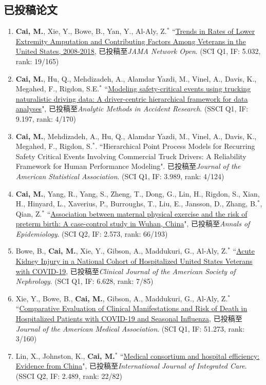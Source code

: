 \documentclass[11pt, a4paper]{article}
\begin{document}
	\subsection*{已投稿论文}
	\begin{enumerate}[leftmargin=0ex,itemsep=1ex]
		\item \textbf{Cai, M.}, Xie, Y., Bowe, B., Yan, Y., Al-Aly, Z.$^\ast$ ``\ul{Trends in Rates of Lower Extremity Amputation and Contributing Factors Among Veterans in the United States, 2008-2018}, 已投稿至\emph{JAMA Network Open}. (SCI Q1, IF: 5.032, rank: 19/165)
		
		\item \textbf{Cai, M.}, Hu, Q., Mehdizadeh, A., Alamdar Yazdi, M., Vinel, A., Davis, K., Megahed, F., Rigdon, S.E.$^\ast$ ``\ul{Modeling safety-critical events using trucking naturalistic driving data: A driver-centric hierarchical framework for data analyses}", 已投稿至\emph{Analytic Methods in Accident Research}. (SSCI Q1, IF: 9.197, rank: 4/170)
		
		\item \textbf{Cai, M.}, Mehdizadeh, A., Hu, Q., Alamdar Yazdi, M., Vinel, A., Davis, K., Megahed, F., Rigdon, S.$^\ast$. ``Hierarchical Point Process Models for Recurring Safety Critical Events Involving Commercial Truck Drivers: A Reliability Framework for Human Performance Modeling". 已投稿至\emph{Journal of the American Statistical Association}. (SCI Q1, IF: 3.989, rank: 4/124)
		
		\item \textbf{Cai, M.}, Yang, R., Yang, S., Zheng, T., Dong, G., Lin, H., Rigdon, S., Xian, H., Hinyard, L., Xaverius, P., Burroughs, T., Liu, E., Jansson, D., Zhang, B.$^\ast$, Qian, Z.$^\ast$ ``\ul{Association between maternal physical exercise and the risk of preterm birth: A case-control study in Wuhan, China}", 已投稿至\emph{Annals of Epidemiology}. (SCI Q2, IF: 2.573, rank: 66/193)
		
		\item Bowe, B., \textbf{Cai, M.}, Xie, Y., Gibson, A., Maddukuri, G., Al-Aly, Z.$^\ast$ ``\ul{Acute Kidney Injury in a National Cohort of Hospitalized United States Veterans with COVID-19}, 已投稿至\emph{Clinical Journal of the American Society of Nephrology}. (SCI Q1, IF: 6.628, rank: 7/85)
		
		\item Xie, Y., Bowe, B., \textbf{Cai, M.}, Gibson, A., Maddukuri, G., Al-Aly, Z.$^\ast$ ``\ul{Comparative Evaluation of Clinical Manifestations and Risk of Death in Hospitalized Patients with COVID-19 and Seasonal Influenza}, 已投稿至\emph{Journal of the American Medical Association}. (SCI Q1, IF: 51.273, rank: 3/160)
		
		\item Lin, X., Johnston, K., \textbf{Cai, M.}$^*$ ``\ul{Medical consortium and hospital efficiency: Evidence from China}", 已投稿至\emph{International Journal of Integrated Care}. (SSCI Q2, IF: 2.489, rank: 22/82)
	\end{enumerate}
	
\end{document}
